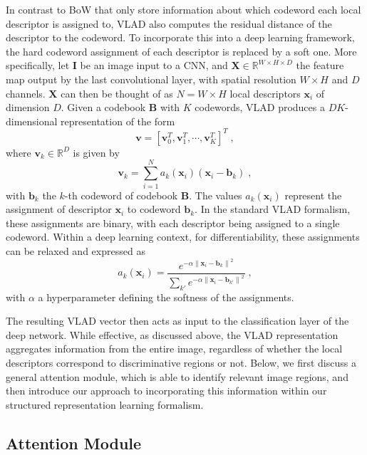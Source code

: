 \documentclass{bmvc2k}
\newcommand{\bB}{\mathbf{B}}
\newcommand{\bb}{\mathbf{b}}
\newcommand{\bX}{\mathbf{X}}
\newcommand{\bx}{\mathbf{x}}
\newcommand{\bv}{\mathbf{v}}
\newcommand{\bI}{\mathbf{I}}
\begin{document}
In contrast to BoW that only store information about which codeword each local descriptor is assigned to, VLAD also computes the residual distance of the descriptor to the codeword. 
To incorporate this into a deep learning framework, the hard codeword assignment of each descriptor is replaced by a soft one.
More specifically, let $\bI$ be an image input to a CNN, and $\bX \in \mathbb{R}^{W \times H \times D}$ the feature map output by the last convolutional layer, with spatial resolution $W \times H$ and $D$ channels. $\bX$ can then be thought of as $N = W \times H$ local descriptors $\bx_{i}$ of dimension $D$. Given a codebook $\bB$ with $K$ codewords, VLAD produces a $DK$-dimensional representation of the form
\begin{equation}
    \bv = [ \bv_0^T, \bv_1^T, \cdots, \bv_K^T]^T\;,
    \label{eq:vlad_vector}
\end{equation}
where $\bv_k \in \mathbb{R}^D$ is given by
\begin{equation}
       \bv_k = \sum_{i=1}^N a_k(\bx_{i})  \left( \bx_{i} - \bb_k \right)\;,
       \label{eq:vlad_residual}
\end{equation}
with $\bb_k$ the $k$-th codeword of codebook $\bB$. The values $a_k(\bx_{i})$ represent the assignment of descriptor $\bx_{i}$ to codeword $\bb_k$. In the standard VLAD formalism, these assignments are binary, with each descriptor being assigned to a single codeword. Within a deep learning context, for differentiability, these assignments can be relaxed and expressed as
\begin{equation}
      a_k(\bx_{i})= \frac{ e^{-\alpha\left\| \bx_{i}-\bb_k  \right\|^2}}{\sum_{k'}{e^{-\alpha\left\| \bx_{i}-\bb_{k'} \right \|^2}}}\;,
	\label{eq:vlad_soft_assgn}
\end{equation}	
with $\alpha$ a hyperparameter defining the softness of the assignments. 


The resulting VLAD vector then acts as input to the classification layer of the deep network. While effective, as discussed above, the VLAD representation aggregates information from the entire image, regardless of whether the local descriptors correspond to discriminative regions or not. Below, we first discuss a general attention module, which is able to identify relevant image regions, and then introduce our approach to incorporating this information within our structured representation learning formalism.

\subsection{Attention Module}\label{sec:attention}
\end{document}
